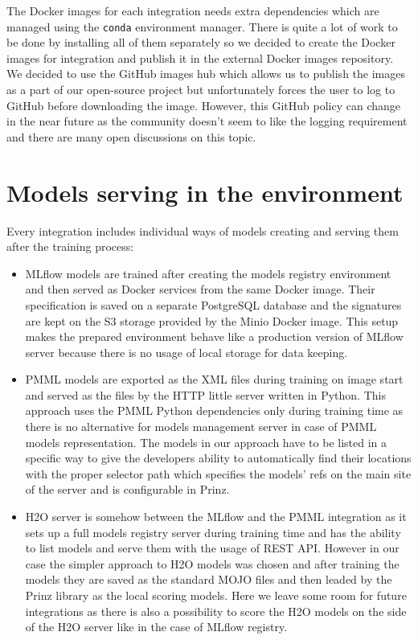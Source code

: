 The Docker images for each integration needs extra dependencies which are managed using the \texttt{conda}
environment manager. There is quite a lot of work to be done by installing all of them separately
so we decided to create the Docker images for integration and publish it in the external Docker
images repository. We decided to use the GitHub images hub which allows us to publish the images
as a part of our open-source project but unfortunately forces the user to log to GitHub before
downloading the image. However, this GitHub policy can change in the near future as the community
doesn’t seem to like the logging requirement and there are many open discussions on this topic.

\section{Models serving in the environment}

Every integration includes individual ways of models creating and serving them after the training process:

\begin{itemize}
	\item MLflow models are trained after creating the models registry environment and then served as
	Docker services from the same Docker image. Their specification is saved on a separate PostgreSQL
	database and the signatures are kept on the S3 storage provided by the Minio Docker image. This setup
	makes the prepared environment behave like a production version of MLflow server because there is no
	usage of local storage for data keeping.

	\item PMML models are exported as the XML files during training on image start and served as the files
	by the HTTP little server written in Python. This approach uses the PMML Python dependencies only during
	training time as there is no alternative for  models management server in case of PMML models representation.
	The models in our approach have to be listed in a specific way to give the developers ability to
	automatically find their locations with the proper selector path which specifies the models’ refs on the
	main site of the server and is configurable in Prinz.

	\item H2O server is somehow between the MLflow and the PMML integration as it sets up a full models
	registry server during training time and has the ability to list models and serve them with the usage
	of REST API. However in our case the simpler approach to H2O models was chosen and after training the
	models they are saved as the standard MOJO files and then leaded by the Prinz library as the local
	scoring models. Here we leave some room for future integrations as there is also a possibility to
	score the H2O models on the side of the H2O server like in the case of MLflow registry.
\end{itemize}

